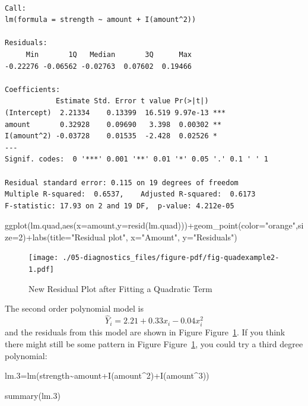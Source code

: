 \documentclass[
  letterpaper,
  DIV=11,
  numbers=noendperiod]{scrreprt}
\newenvironment{Shaded}{\begin{snugshade}}{\end{snugshade}}
\newcommand{\AttributeTok}[1]{\textcolor[rgb]{0.40,0.45,0.13}{#1}}
\newcommand{\DecValTok}[1]{\textcolor[rgb]{0.68,0.00,0.00}{#1}}
\newcommand{\FloatTok}[1]{\textcolor[rgb]{0.68,0.00,0.00}{#1}}
\newcommand{\FunctionTok}[1]{\textcolor[rgb]{0.28,0.35,0.67}{#1}}
\newcommand{\NormalTok}[1]{\textcolor[rgb]{0.00,0.23,0.31}{#1}}
\newcommand{\OtherTok}[1]{\textcolor[rgb]{0.00,0.23,0.31}{#1}}
\newcommand{\SpecialCharTok}[1]{\textcolor[rgb]{0.37,0.37,0.37}{#1}}
\newcommand{\StringTok}[1]{\textcolor[rgb]{0.13,0.47,0.30}{#1}}
\begin{document}
\begin{verbatim}

Call:
lm(formula = strength ~ amount + I(amount^2))

Residuals:
     Min       1Q   Median       3Q      Max 
-0.22276 -0.06562 -0.02763  0.07602  0.19466 

Coefficients:
            Estimate Std. Error t value Pr(>|t|)    
(Intercept)  2.21334    0.13399  16.519 9.97e-13 ***
amount       0.32928    0.09690   3.398  0.00302 ** 
I(amount^2) -0.03728    0.01535  -2.428  0.02526 *  
---
Signif. codes:  0 '***' 0.001 '**' 0.01 '*' 0.05 '.' 0.1 ' ' 1

Residual standard error: 0.115 on 19 degrees of freedom
Multiple R-squared:  0.6537,    Adjusted R-squared:  0.6173 
F-statistic: 17.93 on 2 and 19 DF,  p-value: 4.212e-05
\end{verbatim}

\begin{Shaded}
\begin{Highlighting}[]
\FunctionTok{ggplot}\NormalTok{(lm.quad,}\FunctionTok{aes}\NormalTok{(}\AttributeTok{x=}\NormalTok{amount,}\AttributeTok{y=}\FunctionTok{resid}\NormalTok{(lm.quad)))}\SpecialCharTok{+}\FunctionTok{geom\_point}\NormalTok{(}\AttributeTok{color=}\StringTok{"orange"}\NormalTok{,}\AttributeTok{size=}\DecValTok{2}\NormalTok{)}\SpecialCharTok{+}\FunctionTok{labs}\NormalTok{(}\AttributeTok{title=}\StringTok{"Residual plot"}\NormalTok{, }\AttributeTok{x=}\StringTok{"Amount"}\NormalTok{, }\AttributeTok{y=}\StringTok{"Residuals"}\NormalTok{)}
\end{Highlighting}
\end{Shaded}

\begin{figure}[H]

{\centering \texttt{[image: ./05-diagnostics\_files/figure-pdf/fig-quadexample2-1.pdf]}

}

\caption{\label{fig-quadexample2}New Residual Plot after Fitting a
Quadratic Term}

\end{figure}

The second order polynomial model is
\[\hat{Y}_{i} = 2.21 + 0.33x_{i}-0.04x^{2}_{i}\] and the residuals from
this model are shown in Figure Figure~\ref{fig-quadexample2}. If you
think there might still be some pattern in Figure
Figure~\ref{fig-quadexample2}, you could try a third degree polynomial:

\begin{Shaded}
\begin{Highlighting}[]
\NormalTok{lm}\FloatTok{.3}\OtherTok{=}\FunctionTok{lm}\NormalTok{(strength}\SpecialCharTok{\textasciitilde{}}\NormalTok{amount}\SpecialCharTok{+}\FunctionTok{I}\NormalTok{(amount}\SpecialCharTok{\^{}}\DecValTok{2}\NormalTok{)}\SpecialCharTok{+}\FunctionTok{I}\NormalTok{(amount}\SpecialCharTok{\^{}}\DecValTok{3}\NormalTok{))}

\FunctionTok{summary}\NormalTok{(lm}\FloatTok{.3}\NormalTok{)}
\end{Highlighting}
\end{Shaded}
\end{document}
